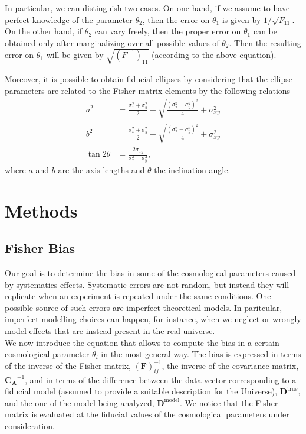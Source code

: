 \documentclass[modern]{lsstdescnote}
\begin{document}
In particular, we can distinguish two cases.
On one hand, if we assume to have perfect knowledge of the parameter $\theta_2$, then the error on $\theta_1$ is given by $1/\sqrt{F_{11}}$. 
On the other hand, if $\theta_2$ can vary freely, then the proper error on $\theta_1$ can be obtained only after
marginalizing over all possible values of $\theta_2$.
Then the resulting error on $\theta_1$ will be given by $\sqrt{\left(F^{-1}\right)_{11}}$ (according to the above equation). 


Moreover, it is possible to obtain fiducial ellipses by considering
that the ellipse parameters are related to the Fisher matrix elements by the following relations
\begin{align}
  a^{2} &=\frac{\sigma_{x}^{2}+\sigma_{y}^{2}}{2}+\sqrt{\frac{\left(\sigma_{x}^{2}-\sigma_{y}^{2}\right)^{2}}{4}+\sigma_{x y}^{2}} \\
  b^{2} &=\frac{\sigma_{x}^{2}+\sigma_{y}^{2}}{2}-\sqrt{\frac{\left(\sigma_{x}^{2}-\sigma_{y}^{2}\right)^{2}}{4}+\sigma_{x y}^{2}} \\
  \tan 2 \theta &=\frac{2 \sigma_{x y}}{\sigma_{x}^{2}-\sigma_{y}^{2}},
\end{align}
where $a$ and $b$ are the axis lengths and $\theta$ the inclination angle.

\section{Methods}
\subsection{Fisher Bias}
Our goal is to determine the bias in some of the cosmological parameters caused by systematics effects. 
Systematic errors are not random, but instead they will replicate when an experiment is repeated under the same conditions.
One possible source of such errors are imperfect theoretical models. In paritcular, imperfect modelling choices 
can happen, for instance, when we neglect or wrongly model effects that are instead present in the real universe.\\

We now introduce the equation that allows to compute the bias in a certain cosmological parameter $\theta_i$ in the most general way. 
The bias is expressed in terms of the inverse of the Fisher matrix, $(\boldsymbol{F})^{-1}_{ij}$, the inverse of the covariance matrix, $\boldsymbol{C_A}^{-1}$, and in terms of the difference between the data vector
corresponding to a fiducial model (assumed to provide a suitable description for the Universe), $\boldsymbol{D}^{\mathrm{true}}$, and the one of the model being analyzed, $\boldsymbol{D}^{\mathrm{model}}$.
We notice that the Fisher matrix is evaluated at the fiducial values of the cosmological parameters under consideration.
\end{document}
